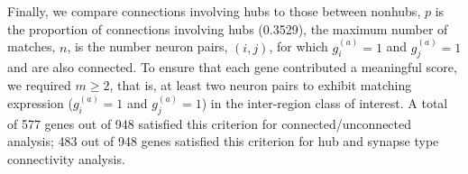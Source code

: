 \documentclass[10pt,letterpaper]{article}
\begin{document}
Finally, we compare connections involving hubs to those between nonhubs, $p$ is the proportion of connections involving hubs (0.3529), the maximum number of matches, $n$, is the number neuron pairs, $(i,j)$, for which $g^{(a)}_i = 1$ and $g^{(a)}_j = 1$ and are also connected.
To ensure that each gene contributed a meaningful score, we required $m \geq 2$, that is, at least two neuron pairs to exhibit matching expression ($g^{(a)}_i = 1$ and $g^{(a)}_j = 1$) in the inter-region class of interest.
A total of 577 genes out of 948 satisfied this criterion for connected/unconnected analysis; 483 out of 948 genes satisfied this criterion for hub and synapse type connectivity analysis.
\end{document}
